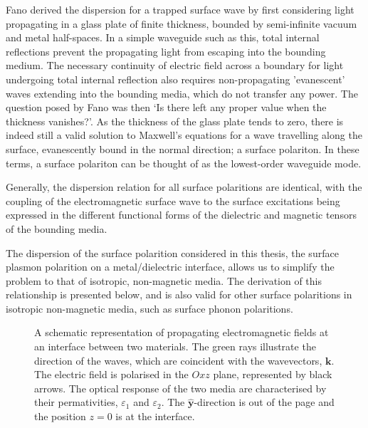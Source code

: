 \documentclass[oneside,10pt,a4paper]{book}
\begin{document}
Fano \cite{Fano1941} derived the dispersion for a trapped surface wave by first considering light propagating in a glass plate of finite thickness, bounded by semi-infinite vacuum and metal half-spaces.  In a simple waveguide such as this, total internal reflections prevent the propagating light from escaping into the bounding medium. The necessary continuity of electric field across a boundary for light undergoing total internal reflection also requires non-propagating 'evanescent' waves extending into the bounding media, which do not  transfer any power. The question posed by Fano was then `Is there left any proper value when the thickness vanishes?'. As the thickness of the glass plate tends to zero, there is indeed still a valid solution to Maxwell's equations for a wave travelling along the surface, evanescently bound in the normal direction; a surface polariton. In these terms, a surface polariton can be thought of as the lowest-order waveguide mode.

Generally, the dispersion relation for all surface polaritions are identical, with the coupling of the electromagnetic surface wave to the surface excitations being expressed in the different functional forms of the dielectric and magnetic tensors of the bounding media.  

The dispersion of the surface polarition considered in this thesis, the surface plasmon polarition on a metal/dielectric interface, allows us to simplify the problem to that of isotropic, non-magnetic media. The derivation of this relationship\cite{Raether1988} is presented below, and is also valid for other surface polaritions in isotropic non-magnetic media, such as surface phonon polaritions.

\begin{figure}[h]
\begin{center}

\end{center}
\caption{\label{fig:planar-coords}A schematic representation of propagating electromagnetic fields at an interface between two materials. The green rays illustrate the direction of the waves, which are coincident with the wavevectors, \color{green}$\mathbf{k}$\color{black}. The electric field is polarised in the $Oxz$ plane, represented by black arrows. The optical response of the two media are characterised by their permativities, $\varepsilon_1$ and $\varepsilon_2$. The $\mathbf{\hat{y}}$-direction is out of the page and the position $z=0$ is at the interface. }
\end{figure}
\end{document}
